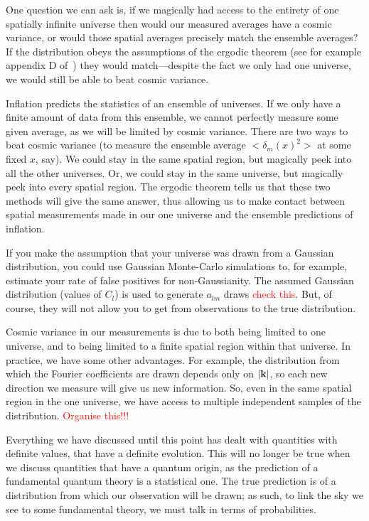 One question we can ask is, if we magically had access to the entirety of one spatially infinite universe
then would our measured averages have a cosmic variance, or would those spatial averages
precisely match the ensemble averages?
If the distribution obeys the assumptions of the ergodic theorem
(see for example appendix D of~\cite{Weinberg_cosmo})
they would match---despite the fact we only had one universe,
we would still be able to beat cosmic variance.


Inflation predicts the statistics of an ensemble of universes.
If we only have a finite amount of data from this ensemble,
we cannot perfectly measure some given average, as we will be limited by cosmic variance.
There are two ways to beat cosmic variance (to measure the ensemble
average $<\delta_m(x)^2>$ at some fixed $x$, say).
We could stay in the same spatial region, but magically peek into all the other universes.
Or, we could stay in the same universe, but magically peek into every spatial region.
The ergodic theorem tells us that these two methods will give the same answer,
thus allowing us to make contact between spatial measurements made in our one universe and the ensemble predictions of inflation.

  
If you make the assumption that your universe was drawn from a Gaussian
distribution, you could use Gaussian Monte-Carlo simulations to,
for example, estimate your rate of false positives for non-Gaussianity.
The assumed Gaussian distribution (values of $C_l$) is used to generate $a_{lm}$ draws
\textcolor{red}{check this}.
But, of course, they will not allow you to get from observations to the true distribution. 


Cosmic variance in our measurements is due to both being limited to one universe, and to being
limited to a finite spatial region within that universe.
In practice, we have some other advantages.
For example, the distribution from which the Fourier coefficients are drawn
depends only on $|\mathbf{k}|$, so each new direction we measure will give us new information.
So, even in the same spatial region in the one universe, we have access to multiple independent samples of the distribution.
\textcolor{red}{Organise this!!!}


    Everything we have discussed until this point has dealt with quantities
    with definite values, that have a definite evolution. This will no longer
    be true when we discuss quantities that have a quantum origin, as
    the prediction of a fundamental quantum theory is a statistical one.
    The true prediction is of a distribution from which our observation will be drawn;
    as such, to link the sky we see to some fundamental theory,
    we must talk in terms of probabilities.


